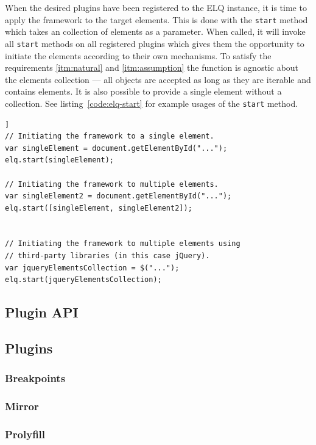 \documentclass[a4paper,11pt]{kth-mag}
\newcommand{\code}[1]{\texttt{#1}}
\newcommand\abbr[2][]{\uppercase{#2}\ifthenelse{\equal{#1}{}}%
                     {}{#1}}
\begin{document}
          When the desired plugins have been registered to the \abbr{elq} instance, it is time to apply the framework to the target \glspl{element}.
          This is done with the \code{start} method which takes an collection of \glspl{element} as a parameter.
          When called, it will invoke all \code{start} methods on all registered plugins which gives them the opportunity to initiate the \glspl{element} according to their own mechanisms.
          To satisfy the requirements \ref{itm:natural} and \ref{itm:assumption} the function is agnostic about the \glspl{element} collection --- all objects are accepted as long as they are iterable and contains \glspl{element}.
          It is also possible to provide a single \gls{element} without a collection.
          See listing~\ref{code:elq-start} for example usages of the \code{start} method.
          \begin{lstlisting}[caption={Example usages of the \code{start} method. The method only requires an iterable collection, so it is library agnostic.},captionpos=b,label={code:elq-start}]]
// Initiating the framework to a single element.
var singleElement = document.getElementById("...");
elq.start(singleElement);

// Initiating the framework to multiple elements.
var singleElement2 = document.getElementById("...");
elq.start([singleElement, singleElement2]);


// Initiating the framework to multiple elements using
// third-party libraries (in this case jQuery).
var jqueryElementsCollection = $("...");
elq.start(jqueryElementsCollection);
          \end{lstlisting}

        \subsection{Plugin API}
        \subsection{Plugins}
          \subsubsection{Breakpoints}
          \subsubsection{Mirror}
          \subsubsection{Prolyfill}
\end{document}

